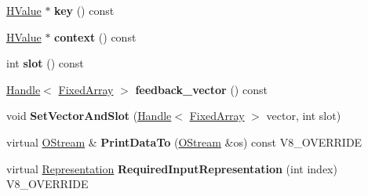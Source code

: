 \begin{DoxyCompactItemize}
\item 
\hypertarget{classv8_1_1internal_1_1_v8___f_i_n_a_l_aecac5f6b59aaff1b8ba60417c772e136}{}\hyperlink{classv8_1_1internal_1_1_h_value}{H\+Value} $\ast$ {\bfseries key} () const \label{classv8_1_1internal_1_1_v8___f_i_n_a_l_aecac5f6b59aaff1b8ba60417c772e136}

\item 
\hypertarget{classv8_1_1internal_1_1_v8___f_i_n_a_l_a8294bece2df148267ec52228e2139030}{}\hyperlink{classv8_1_1internal_1_1_h_value}{H\+Value} $\ast$ {\bfseries context} () const \label{classv8_1_1internal_1_1_v8___f_i_n_a_l_a8294bece2df148267ec52228e2139030}

\item 
\hypertarget{classv8_1_1internal_1_1_v8___f_i_n_a_l_ab2e2be77bd895fae71de18a24a557643}{}int {\bfseries slot} () const \label{classv8_1_1internal_1_1_v8___f_i_n_a_l_ab2e2be77bd895fae71de18a24a557643}

\item 
\hypertarget{classv8_1_1internal_1_1_v8___f_i_n_a_l_a9db8e7d077e3e906a25da2747defc827}{}\hyperlink{classv8_1_1internal_1_1_handle}{Handle}$<$ \hyperlink{classv8_1_1internal_1_1_fixed_array}{Fixed\+Array} $>$ {\bfseries feedback\+\_\+vector} () const \label{classv8_1_1internal_1_1_v8___f_i_n_a_l_a9db8e7d077e3e906a25da2747defc827}

\item 
\hypertarget{classv8_1_1internal_1_1_v8___f_i_n_a_l_a7a756c295327d9268449fa3c63e659cc}{}void {\bfseries Set\+Vector\+And\+Slot} (\hyperlink{classv8_1_1internal_1_1_handle}{Handle}$<$ \hyperlink{classv8_1_1internal_1_1_fixed_array}{Fixed\+Array} $>$ vector, int slot)\label{classv8_1_1internal_1_1_v8___f_i_n_a_l_a7a756c295327d9268449fa3c63e659cc}

\item 
\hypertarget{classv8_1_1internal_1_1_v8___f_i_n_a_l_ac450dad970b14246be761ccf5004924b}{}virtual \hyperlink{classv8_1_1internal_1_1_o_stream}{O\+Stream} \& {\bfseries Print\+Data\+To} (\hyperlink{classv8_1_1internal_1_1_o_stream}{O\+Stream} \&os) const V8\+\_\+\+O\+V\+E\+R\+R\+I\+D\+E\label{classv8_1_1internal_1_1_v8___f_i_n_a_l_ac450dad970b14246be761ccf5004924b}

\item 
\hypertarget{classv8_1_1internal_1_1_v8___f_i_n_a_l_a6c6d1f37f40b113d8f4062f1ffff7215}{}virtual \hyperlink{classv8_1_1internal_1_1_representation}{Representation} {\bfseries Required\+Input\+Representation} (int index) V8\+\_\+\+O\+V\+E\+R\+R\+I\+D\+E\label{classv8_1_1internal_1_1_v8___f_i_n_a_l_a6c6d1f37f40b113d8f4062f1ffff7215}


\end{DoxyCompactItemize}

